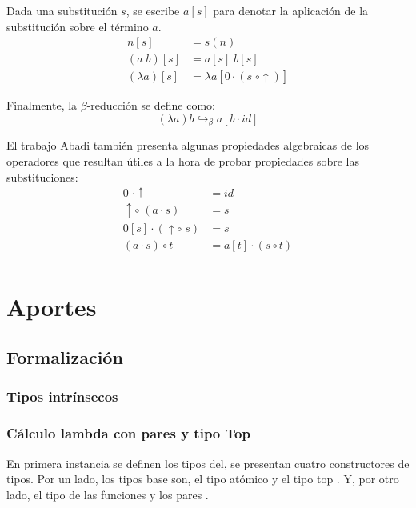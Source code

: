\documentclass[]{report}
\begin{document}
	Dada una substitución $s$, se escribe $a[s]$ para denotar la aplicación de la substitución sobre el término $a$.
	\begin{align*}
		n[s] &= s(n) \\
		(a\; b)[s] &= a[s]\; b[s] \\
		(\lambda a)[s] &= \lambda a[0 \cdot (s \; \circ \uparrow)]
	\end{align*}
	
	Finalmente, la $\beta$-reducción se define como:
	\[ (\lambda a)b \hookrightarrow_{\beta} a[b \cdot id] \]
	
	El trabajo Abadi también presenta algunas propiedades algebraicas de los operadores que resultan útiles a la hora de probar propiedades sobre las substituciones:
	\begin{align*}
		0 \; \cdot \uparrow &= id \\
		\uparrow \circ\; (a \cdot s) &= s \\
		0[s] \cdot (\uparrow \circ\; s) &= s \\
		(a \cdot s) \circ t &= a[t] \cdot (s \circ t) \\
	\end{align*}
	
	
	\chapter{Aportes}
	\section{Formalización}
	
	
	\subsection{Tipos intrínsecos}
	
	\subsection{Cálculo lambda con pares y tipo Top}
	
	En primera instancia se definen los tipos del, se presentan cuatro constructores de tipos.
	Por un lado, los tipos base son, el tipo atómico \AgdaInductiveConstructor{$\tau$} y el tipo top \AgdaInductiveConstructor{$\top$}.
	Y, por otro lado, el tipo de las funciones \AgdaInductiveConstructor{$\_\Rightarrow\_$} y los pares \AgdaInductiveConstructor{$\_\times\_$}.
\end{document}
